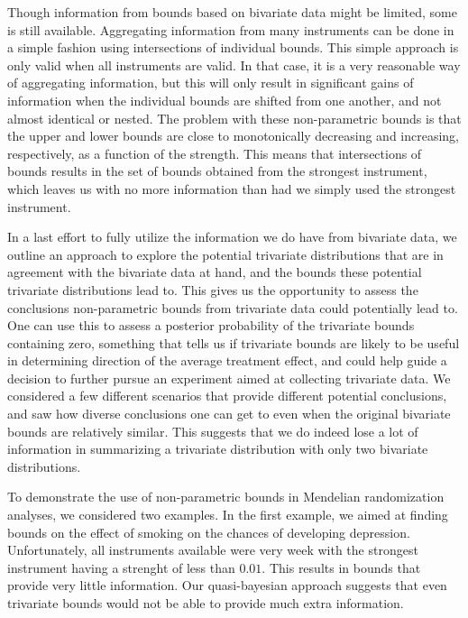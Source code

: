 \documentclass[
]{article}
\theoremstyle{plain}
\begin{document}
{Though information from bounds based on bivariate data might be limited, some is still available. Aggregating information from many instruments can be done in a simple fashion using intersections of individual bounds. This simple approach is only valid when all instruments are valid. In that case, it is a very reasonable way of aggregating information, but this will only result in significant gains of information when the individual bounds are shifted from one another, and not almost identical or nested. The problem with these non-parametric bounds is that the upper and lower bounds are close to monotonically decreasing and increasing, respectively, as a function of the strength. This means that intersections of bounds results in the set of bounds obtained from the strongest instrument, which leaves us with no more information than had we simply used the strongest instrument.

In a last effort to fully utilize the information we do have from bivariate data, we outline an approach to explore the potential trivariate distributions that are in agreement with the bivariate data at hand, and the bounds these potential trivariate distributions lead to. This gives us the opportunity to assess the conclusions non-parametric bounds from trivariate data could potentially lead to. One can use this to assess a posterior probability of the trivariate bounds containing zero, something that tells us if trivariate bounds are likely to be useful in determining direction of the average treatment effect, and could help guide a decision to further pursue an experiment aimed at collecting trivariate data. We considered a few different scenarios that provide different potential conclusions, and saw how diverse conclusions one can get to even when the original bivariate bounds are relatively similar. This suggests that we do indeed lose a lot of information in summarizing a trivariate distribution with only two bivariate distributions.

To demonstrate the use of non-parametric bounds in Mendelian randomization analyses, we considered two examples. In the first example, we aimed at finding bounds on the effect of smoking on the chances of developing depression. Unfortunately, all instruments available were very week with the strongest instrument having a strenght of less than \(0.01\). This results in bounds that provide very little information. Our quasi-bayesian approach suggests that even trivariate bounds would not be able to provide much extra information.

}
\end{document}
